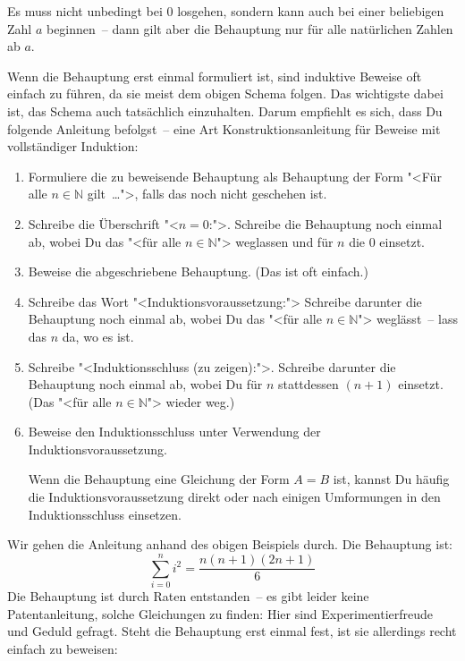 Es muss nicht unbedingt bei $0$
losgehen, sondern kann auch bei einer beliebigen Zahl $a$ beginnen~--
dann gilt aber die Behauptung nur für alle natürlichen Zahlen ab $a$.

Wenn die Behauptung erst einmal formuliert ist, sind induktive Beweise
oft einfach zu führen, da sie meist dem obigen Schema folgen.  Das
wichtigste dabei ist, das Schema auch tatsächlich einzuhalten.  Darum
empfiehlt es sich, dass Du folgende Anleitung befolgst~-- eine Art
Konstruktionsanleitung für Beweise mit vollständiger Induktion:
%
\begin{enumerate}
\item Formuliere die zu beweisende Behauptung als Behauptung der
  Form "<Für alle $n\in\mathbb{N}$ gilt~\ldots">, falls das noch nicht
  geschehen ist.
\item Schreibe die Überschrift "<$n = 0$:">. Schreibe die
  Behauptung noch einmal ab, wobei Du das "<für alle $n\in\mathbb{N}$"> weglassen und für $n$ die $0$ einsetzt.
\item Beweise die abgeschriebene Behauptung.  (Das ist oft
  einfach.)
\item Schreibe das Wort "<Induktionsvoraussetzung:"> Schreibe
  darunter die Behauptung noch einmal ab, wobei Du das "<für
  alle $n\in\mathbb{N}$"> weglässt~-- lass das $n$ da, wo es ist.
\item Schreibe "<Induktionsschluss (zu zeigen):">.
  Schreibe darunter die Behauptung noch einmal ab, wobei Du für
  $n$ stattdessen $(n+1)$ einsetzt.  (Das "<für alle
  $n\in\mathbb{N}$"> wieder weg.)
\item Beweise den Induktionsschluss unter Verwendung der
  Induktionsvoraussetzung.  

  Wenn die Behauptung eine Gleichung der Form $A = B$ ist, kannst
  Du häufig die Induktionsvoraussetzung direkt oder nach
  einigen Umformungen in den Induktionsschluss einsetzen.
\end{enumerate}
%
Wir gehen die Anleitung anhand des obigen Beispiels durch.  Die
Behauptung ist:
%
\begin{displaymath}
  \sum_{i=0}^n i^2 = \dfrac{n(n+1)(2n+1)}{6}
\end{displaymath}
%
Die Behauptung ist durch Raten entstanden~-- es gibt leider keine
Patentanleitung, solche Gleichungen zu finden: Hier sind
Experimentierfreude und Geduld gefragt.  Steht die Behauptung erst
einmal fest, ist sie allerdings recht einfach zu beweisen:
%
